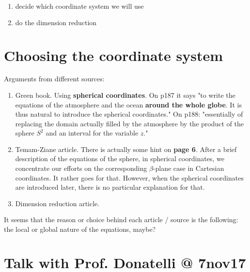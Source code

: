\documentclass{article}
\begin{document}
\begin{enumerate}
\item decide which coordinate system we will use
\item do the dimension reduction
\end{enumerate}

\section{Choosing the coordinate system}

Arguments from different sources:
\begin{enumerate}
\item Green book. Using \textbf{spherical coordinates}. On p187 it says "to write the equations of the atmosphere and the ocean \textbf{around the whole globe}. It is thus natural to introduce the spherical coordinates." On p188: "essentially of replacing the domain actually filled by the atmosphere by the product of the sphere $S^2$ and an interval for the variable $z$."
\item Temam-Ziane article. There is actually some hint on \textbf{page 6}. After a brief description of the equations of the sphere, in spherical coordinates, we concentrate our efforts on the corresponding $\beta$-plane case in Cartesian coordinates. It rather goes for that. However, when the spherical coordinates are introduced later, there is no particular explanation for that.
\item Dimension reduction article.
\end{enumerate}

It seems that the reason or choice behind each article / source is the following: the local or global nature of the equations, maybe?

\section{Talk with Prof. Donatelli @ 7nov17}
\end{document}
